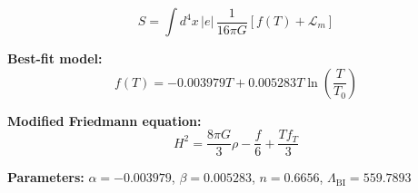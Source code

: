 
\begin{equation}
  S = \int d^4x \, |e| \, \frac{1}{16\pi G} \left[ f(T) + \mathcal{L}_m \right]
\end{equation}

\textbf{Best-fit model:}
\begin{equation}
  f(T) = -0.003979 T + 0.005283 T \ln\!\left(\frac{T}{T_0}\right)
\end{equation}

\textbf{Modified Friedmann equation:}
\begin{equation}
  H^2 = \frac{8\pi G}{3} \rho - \frac{f}{6} + \frac{T f_T}{3}
\end{equation}

\textbf{Parameters:}
$\alpha = -0.003979$, \quad
$\beta = 0.005283$, \quad
$n = 0.6656$, \quad
$\Lambda_{\text{BI}} = 559.7893$